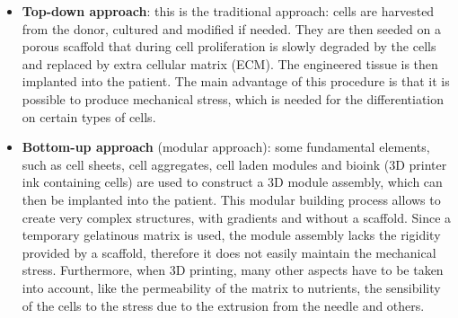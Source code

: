 \begin{multicols}{2}
  \begin{itemize}
    \item \textbf{Top-down approach}: this is the traditional approach: cells are harvested from the donor, cultured and modified if needed.
      They are then seeded on a porous scaffold that during cell proliferation is slowly degraded by the cells and replaced by extra cellular matrix (ECM).
      The engineered tissue is then implanted into the patient.
      The main advantage of this procedure is that it is possible to produce mechanical stress, which is needed for the differentiation on certain types of cells.
    \item \textbf{Bottom-up approach} (modular approach): some fundamental elements, such as cell sheets, cell aggregates, cell laden modules and bioink (3D printer ink containing cells) are used to construct a 3D module assembly, which can then be implanted into the patient.
      This modular building process allows to create very complex structures, with gradients and without a scaffold.
      Since a temporary gelatinous matrix is used, the module assembly lacks the rigidity provided by a scaffold, therefore it does not easily maintain the mechanical stress.
      Furthermore, when 3D printing, many other aspects have to be taken into account, like the permeability of the matrix to nutrients, the sensibility of the cells to the stress due to the extrusion from the needle and others.
  \end{itemize}
\end{multicols}
